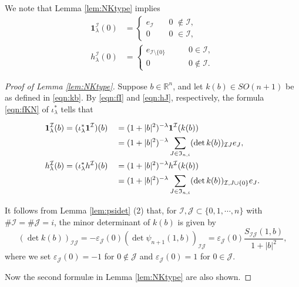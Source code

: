 We note that Lemma \ref{lem:NKtype} implies 
\begin{align}
\label{eqn:I10}
{\mathbf{1}}_{\lambda}^{\mathcal{I}}(0)
&=
 \begin{cases}
 e_{\mathcal{I}} \quad &\text{0 $\not\in {\mathcal{I}}$}, 
\\
 0 \quad &\text{0 $\in {\mathcal{I}}$}, 
 \end{cases} 
\\
\label{eqn:hI0}
h_{\lambda}^{\mathcal{I}}(0)
&=
\begin{cases}
e_{{\mathcal{I}} \setminus \{0\}}\qquad &0 \in {\mathcal{I}}, 
\\
0
\qquad &0 \notin {\mathcal{I}}.  
\end{cases}
\end{align}

\begin{proof}
[Proof of Lemma \ref{lem:NKtype}]
Suppose $b \in {\mathbb{R}}^n$, 
 and let $k(b) \in SO(n+1)$ be as defined 
 in \eqref{eqn:kb}.  
By \eqref{eqn:fI} and \eqref{eqn:hJ}, 
 respectively,
 the formula \eqref{eqn:fKN} of $\iota_{\lambda}^{\ast}$ tells
 that 

\begin{alignat*}{2}
{\bf{1}}_{\lambda}^{\mathcal{I}}(b)
&=(\iota_{\lambda}^{\ast} {\bf{1}}^{\mathcal{I}})(b)
&&=(1+|b|^2)^{-\lambda}{\bf{1}}^{\mathcal{I}}(k(b))
\\
&
&&=(1+|b|^2)^{-\lambda} \sum_{J \in {\mathfrak{I}}_{n,i}}
(\det k(b))_{{\mathcal{I}} J}e_J, 
\\
h_{\lambda}^{\mathcal{I}}(b)
&=(\iota_{\lambda}^{\ast} h^{\mathcal{I}})(b)
&&= (1+|b|^2)^{-\lambda} h^{\mathcal{I}}(k(b))
\\
&
&&= (1+|b|^2)^{-\lambda} \sum_{J \in {\mathfrak{I}}_{n,i}}
   (\det k(b))_{{\mathcal{I}}, J \cup \{0\}} e_J.  
\end{alignat*}



It follows from Lemma \ref{lem:psidet} (2)
 that, for ${\mathcal{I}},{\mathcal{J}} \subset \{0,1,\cdots,n\}$
 with 
 $\# {\mathcal{I}} = \# {\mathcal{J}}=i$, 
 the minor determinant
 of 
$
k(b)
$ is given by 
\begin{equation}
\label{eqn:kbdet}
(\det k(b))_{{\mathcal{I}} {\mathcal{J}}}
=
-\varepsilon_{\mathcal{J}}(0) 
(\det \psi_{n+1}(1,b))_{{\mathcal{I}} {\mathcal{J}}} 
=
 \varepsilon_{\mathcal{J}} (0) \frac {S_{{\mathcal{I}} {\mathcal{J}}} (1,b)}{1 + |b|^2}, 
\end{equation}
where we set $\varepsilon_{\mathcal{J}} (0)=-1$
 for $0 \notin {\mathcal{J}}$
 and $\varepsilon_{\mathcal{J}} (0)=1$ for $0 \in {\mathcal{J}}$.  



Now the second formul{\ae} in Lemma \ref{lem:NKtype} 
 are also shown.  
\end{proof}

